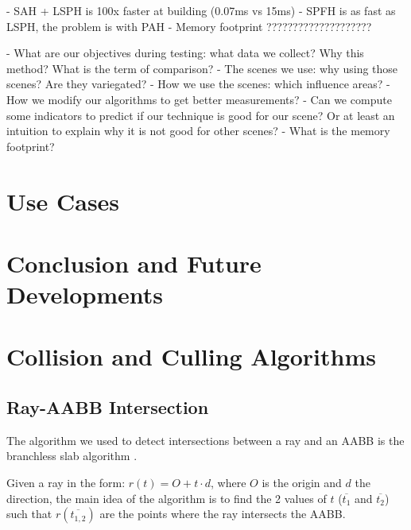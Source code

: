 \documentclass{PoliMi_MasterThesis}
\begin{document}
- SAH + LSPH is 100x faster at building (0.07ms vs 15ms)
- SPFH is as fast as LSPH, the problem is with PAH
- Memory footprint ????????????????????


- What are our objectives during testing: what data we collect? Why this method? What is the term of comparison?
- The scenes we use: why using those scenes? Are they variegated?
- How we use the scenes: which influence areas?
- How we modify our algorithms to get better measurements?
- Can we compute some indicators to predict if our technique is good for our scene? Or at least an intuition to explain why it is not good for other scenes?
- What is the memory footprint?

\chapter{Use Cases} \label{ch:use_cases}

\chapter{Conclusion and Future Developments} \label{ch:conclusion}




\cleardoublepage
{} %
\appendix

\chapter{Collision and Culling Algorithms}
\section{Ray-AABB Intersection} \label{sec:ray_box_intersection}
The algorithm we used to detect intersections between a ray and an AABB is the branchless slab algorithm \cite{ray_box_intersection}.

Given a ray in the form: $r(t) = O + t\cdot d$, where $O$ is the origin and $d$ the direction, the main idea of the algorithm is to find the 2 values of $t$ ($\overline{t_1}$ and $\overline{t_2}$) such that $r(\overline{t_{1,2}})$ are the points where the ray intersects the AABB.
\end{document}
